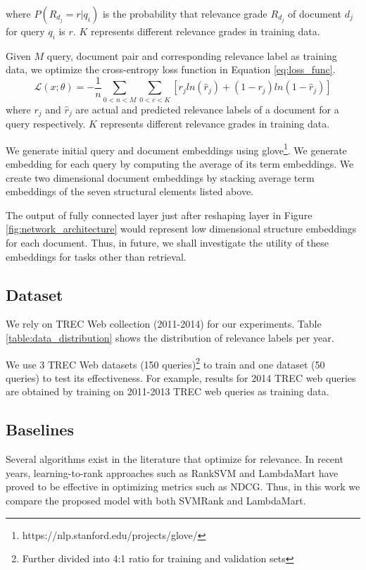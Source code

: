 \documentclass[runningheads,a4paper]{llncs}
\begin{document}
where $P(R_{d_j}=r|q_i)$ is the probability that relevance grade $R_{d_j}$ of 
document $d_j$ for query $q_i$ is $r$. $K$ represents different 
relevance grades in training data.

Given $M$ query, document pair and corresponding relevance label as 
training data, we optimize the cross-entropy loss 
function in Equation \ref{eq:loss_func}. 
\begin{equation}
 \label{eq:loss_func}
 \mathcal{L}(x;\theta) = - \frac{1}{n} \sum_{0<n<M}\sum_{0<c<K} 
    [ r_j ln ( \hat r_j) + (1 -  r_j)ln(1 - \hat r_j)]
\end{equation}
where $r_j$ and $\hat r_j$ are actual and predicted relevance labels of a document 
for a query respectively. $K$ represents different relevance grades in training data. 

We generate initial query and document embeddings using 
glove\footnote{https://nlp.stanford.edu/projects/glove/}. We generate embedding for each 
query by computing the average of its term embeddings. We create two dimensional 
document embeddings by stacking average term embeddings of the seven structural elements
listed above. 

The output of fully connected layer just after reshaping layer in Figure \ref{fig:network_architecture} 
would represent low dimensional structure embeddings for each document. 
Thus, in future, we shall investigate the utility of these embeddings for 
tasks other than retrieval. 

\subsection{Dataset}
We rely on TREC Web collection (2011-2014) \cite{collins2015trec} for 
our experiments. Table \ref{table:data_distribution} shows the distribution of 
relevance labels per year. 

We use 3 TREC Web datasets (150 queries)\footnote{Further divided into 4:1 
ratio for training and validation sets} to train and one dataset (50 queries) to test 
its effectiveness. For example, results for 2014 TREC web queries are obtained 
by training on 2011-2013 TREC web queries as training data. 

\subsection{Baselines}
Several algorithms exist
in the literature that optimize for relevance. In recent years, learning-to-rank 
approaches such as RankSVM \cite{Cao2006Sigir} and LambdaMart 
\cite{Burges2010Report} have proved to be effective in optimizing metrics such 
as NDCG. Thus, in this work we  compare the proposed model with both SVMRank and 
LambdaMart. 
\end{document}
